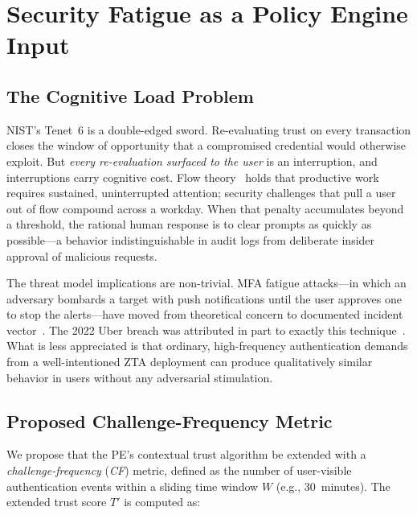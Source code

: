 \documentclass[sigconf,nonacm]{acmart}
\begin{document}
\section{Security Fatigue as a Policy Engine Input}
\label{sec:fatigue}

\subsection{The Cognitive Load Problem}

NIST's Tenet~6 is a double-edged sword. Re-evaluating trust on every transaction
closes the window of opportunity that a compromised credential would otherwise
exploit. But \emph{every re-evaluation surfaced to the user} is an interruption,
and interruptions carry cognitive cost. Flow theory~\cite{csikszentmihalyi_flow}
holds that productive work requires sustained, uninterrupted attention; security
challenges that pull a user out of flow compound across a workday. When that
penalty accumulates beyond a threshold, the rational human response is to clear
prompts as quickly as possible---a behavior indistinguishable in audit logs from
deliberate insider approval of malicious requests.

The threat model implications are non-trivial. MFA fatigue attacks---in which
an adversary bombards a target with push notifications until the user approves
one to stop the alerts---have moved from theoretical concern to documented
incident vector~\cite{mandiant_mfa_fatigue2023}. The 2022 Uber breach was
attributed in part to exactly this technique~\cite{uber_breach2022}. What is
less appreciated is that ordinary, high-frequency authentication demands from a
well-intentioned ZTA deployment can produce qualitatively similar behavior in
users without any adversarial stimulation.

\subsection{Proposed Challenge-Frequency Metric}

We propose that the PE's contextual trust algorithm be extended with a
\emph{challenge-frequency} (\textit{CF}) metric, defined as the number of
user-visible authentication events within a sliding time window $W$
(e.g., 30~minutes). The extended trust score $T'$ is computed as:
\end{document}
